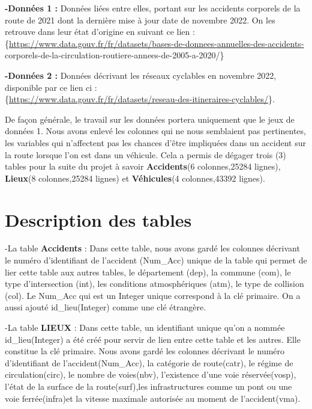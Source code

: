 \documentclass[mstat,12pt]{unswthesis}
\begin{document}
\medskip

\textbf{-Données 1 :} Données liées entre elles, portant sur les
accidents corporels de la route de 2021 dont la dernière mise à jour
date de novembre 2022. On les retrouve dans leur état d'origine en
suivant ce lien :
\{\url{https://www.data.gouv.fr/fr/datasets/bases-de-donnees-annuelles-des-accidents-}
corporels-de-la-circulation-routiere-annees-de-2005-a-2020/\}

\medskip

\textbf{-Données 2 :} Données décrivant les réseaux cyclables en
novembre 2022, disponible par ce lien ci :\\
\{\url{https://www.data.gouv.fr/fr/datasets/reseau-des-itineraires-cyclables/}\}.

\medskip

De façon générale, le travail sur les données portera uniquement que le
jeux de données 1. Nous avons enlevé les colonnes qui ne nous semblaient
pas pertinentes, les variables qui n'affectent pas les chances d'être
impliquées dans un accident sur la route lorsque l'on est dans un
véhicule. Cela a permis de dégager trois (3) tables pour la suite du
projet à savoir \textbf{Accidents}(6 colonnes,25284 lignes),
\textbf{Lieux}(8 colonnes,25284 lignes) et \textbf{Véhicules}(4
colonnes,43392 lignes).

\hypertarget{description-des-tables}{%
\section{Description des tables}\label{description-des-tables}}

\medskip

-La table \textbf{Accidents} : Dans cette table, nous avons gardé les
colonnes décrivant le numéro d'identifiant de l'accident (Num\_Acc)
unique de la table qui permet de lier cette table aux autres tables, le
département (dep), la commune (com), le type d'intersection (int), les
conditions atmosphériques (atm), le type de collision (col). Le Num\_Acc
qui est un Integer unique correspond à la clé primaire. On a aussi
ajouté id\_lieu(Integer) comme une clé étrangère.

\medskip

-La table \textbf{LIEUX} : Dans cette table, un identifiant unique qu'on
a nommée id\_lieu(Integer) a été créé pour servir de lien entre cette
table et les autres. Elle constitue la clé primaire. Nous avons gardé
les colonnes décrivant le numéro d'identifiant de l'accident(Num\_Acc),
la catégorie de route(catr), le régime de circulation(circ), le nombre
de voies(nbv), l'existence d'une voie réservée(vosp), l'état de la
surface de la route(surf),les infrastructures comme un pont ou une voie
ferrée(infra)et la vitesse maximale autorisée au moment de
l'accident(vma).
\end{document}
